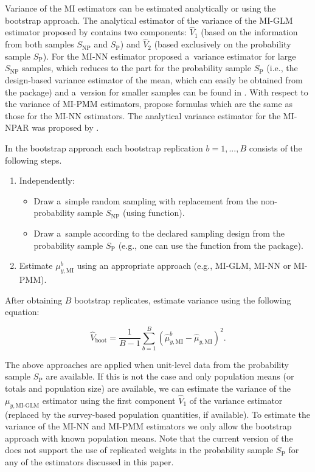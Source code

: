 \documentclass[
]{jss}
\begin{document}
Variance of the MI estimators can be estimated analytically or using the
bootstrap approach. The analytical estimator of the variance of the
MI-GLM estimator proposed by \citet[p. 950]{kim_combining_2021} contains
two components: \(\hat{V}_1\) (based on the information from both
samples \(S_{\text{NP}}\) and \(S_{\text{P}}\)) and \(\hat{V}_2\) (based
exclusively on the probability sample \(S_{\text{P}}\)). For the MI-NN
estimator \citet{yang2021integration} proposed a~variance estimator for
large \(S_{\text{NP}}\) samples, which reduces to the part for the
probability sample \(S_{\text{P}}\) (i.e., the design-based variance
estimator of the mean, which can easily be obtained from the
 package) and a~version for smaller samples can be found in
\citet{chlebicki2025}. With respect to the variance of MI-PMM
estimators, \citet{chlebicki2025} propose formulas which are the same as
those for the MI-NN estimators. The analytical variance estimator for
the MI-NPAR was proposed by \citet{chen_nonparametric_2022}.

In the bootstrap approach each bootstrap replication \(b=1,...,B\)
consists of the following steps.

\begin{enumerate}
\item Independently:
  \begin{itemize}
  \item Draw a~simple random sampling with replacement from the non-probability sample $S_{\text{NP}}$ (using  function).
  \item Draw a~sample according to the declared sampling design from the probability sample $S_{\text{P}}$ (e.g., one can use the  function from the  package).
  \end{itemize}
\item Estimate $\mu_{y, \text{MI}}^b$ using an appropriate approach (e.g., MI-GLM, MI-NN or MI-PMM).
\end{enumerate}

After obtaining \(B\) bootstrap replicates, estimate variance using the
following equation:

\begin{equation}
\hat{V}_{\text{boot}} = \frac{1}{B-1}\sum_{b=1}^B\left(\hat{\mu}^b_{y, \text{MI}} - \hat{\mu}_{y, \text{MI}}\right)^2.
\label{eq-var-bootstrap}
\end{equation}

The above approaches are applied when unit-level data from the
probability sample \(S_{\text{P}}\) are available. If this is not the
case and only population means (or totals and population size) are
available, we can estimate the variance of the \(\mu_{y,\text{MI-GLM}}\)
estimator using the first component \(\hat{V}_1\) of the
\citet{kim_combining_2021} variance estimator (replaced by the
survey-based population quantities, if available). To estimate the
variance of the MI-NN and MI-PMM estimators we only allow the bootstrap
approach with known population means. Note that the current version of
the  does not support the use of replicated weights in
the probability sample \(S_{\text{P}}\) for any of the estimators
discussed in this paper.
\end{document}
